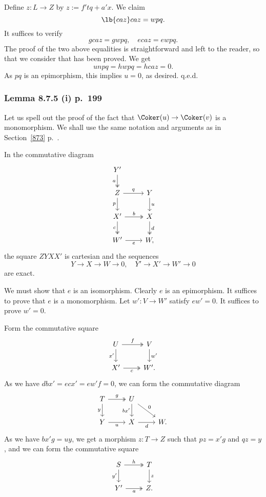 \documentclass[12pt]{article}
\theoremstyle{remark}
\theoremstyle{definition}
\begin{document}
Define $z:L\to Z$ by $z:=f'tq+a'x$. We claim 
\begin{equation}\lb{caz}
caz=wpq.
\end{equation} 
It suffices to verify 
$$
gcaz=gwpq,\quad ecaz=ewpq.
$$ 
The proof of the two above equalities is straightforward and left to the reader, so that we consider that  has been proved. We get 
$$
unpq=hwpq=hcaz=0.
$$ 
As $pq$ is an epimorphism, this implies $u=0$, as desired. q.e.d.

%

\subsubsection{Lemma 8.7.5 (i) p.~199}

Let us spell out the proof of the fact that $\Coker(u)\to\Coker(v)$ is a monomorphism. We shall use the same notation and arguments as in Section~\ref{873} p.~.

In the commutative diagram 
$$
\begin{tikzcd} 
Y'\ar[d,two heads,"a"']\\ 
Z\ar[d,"p"']\ar[r,"q"]&Y\ar[d,"u"]\\ 
X'\ar[d,two heads,"c"']\ar[r,two heads,"b"]&X\ar[d,two heads,"d"]\\ 
W'\ar[r,"e"']&W,
\end{tikzcd}
$$ 
the square $ZYXX'$ is cartesian and the sequences 
$$
Y\to X\to W\to0,\quad Y'\to X'\to W'\to0
$$ 
are exact. 

We must show that $e$ is an isomorphism. Clearly $e$ is an epimorphism. It suffices to prove that $e$ is a monomorphism. Let $w':V\to W'$ satisfy $ew'=0$. It suffices to prove $w'=0$. 

Form the commutative square
$$
\begin{tikzcd} 
U\ar[d,"x'"']\ar[r,two heads,"f"]&V\ar[d,"w'"]\\ 
X'\ar[r,two heads,"c"']&W'.
\end{tikzcd}
$$ 
As we have $dbx'=ecx'=ew'f=0$, we can form the commutative diagram
$$
\begin{tikzcd} 
T\ar[d,"y"']\ar[r,two heads,"g"]&U\ar[d,"bx'"']\ar[rd,"0"]\\ 
Y\ar[r,"u"']&X\ar[r,"d"']&W.
\end{tikzcd}
$$ 
As we have $bx'g=uy$, we get a morphism $z:T\to Z$ such that $pz=x'g$ and $qz=y$, and we can form the commutative square
$$
\begin{tikzcd} 
S\ar[d,"y'"']\ar[r,two heads,"h"]&T\ar[d,"z"]\\ 
Y'\ar[r,two heads,"a"']&Z.
\end{tikzcd}
$$ 
\end{document}
